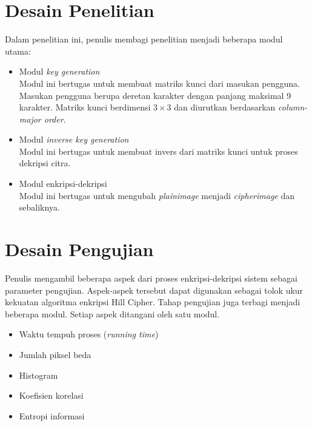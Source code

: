 \section{Desain Penelitian}
Dalam penelitian ini, penulis membagi penelitian menjadi beberapa modul utama:
\begin{itemize}
\item Modul \emph{key generation}\\
Modul ini bertugas untuk membuat matriks kunci dari masukan pengguna. Masukan pengguna berupa deretan
karakter dengan panjang maksimal 9 karakter. Matriks kunci berdimensi $3\times{3}$ dan diurutkan
berdasarkan \emph{column-major order}.
\item Modul \emph{inverse key generation}\\
Modul ini bertugas untuk membuat invers dari matriks kunci untuk proses dekripsi citra.
\item Modul enkripsi-dekripsi\\
Modul ini bertugas untuk mengubah \emph{plainimage} menjadi \emph{cipherimage} dan sebaliknya.
\end{itemize}

\section{Desain Pengujian}
Penulis mengambil beberapa aspek dari proses enkripsi-dekripsi sistem sebagai parameter pengujian.
Aspek-aspek tersebut dapat digunakan sebagai tolok ukur kekuatan algoritma enkripsi Hill Cipher. Tahap pengujian juga terbagi menjadi beberapa modul. Setiap aspek ditangani oleh satu modul.
\begin{itemize}
\item Waktu tempuh proses (\emph{running time})
\item Jumlah piksel beda
\item Histogram
\item Koefisien korelasi
\item Entropi informasi
\end{itemize}